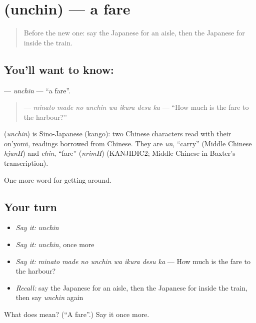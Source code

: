 \section[\texorpdfstring{\ja{うんちん} (unchin)}{うんちん (unchin)}]{ (unchin) — a fare}

\label{lesson:JA-C379-unchin}



\begin{quote}
Before the new one: say the Japanese for an aisle, then the Japanese for inside the train.
\end{quote}

\subsection*{You'll want to know: }
\textbf{} — \emph{unchin} — \textquotedblleft{}a fare\textquotedblright{}.

\begin{quote}
\textbf{  } — \emph{minato made no unchin wa ikura desu ka} — \textquotedblleft{}How much is the fare to the harbour?\textquotedblright{}
\end{quote}

\begin{cousinweb}
\textbf{} (\emph{unchin}) is Sino-Japanese (kango): two Chinese characters read with their on'yomi, readings borrowed from Chinese. They are \emph{un}, \textquotedblleft{}carry\textquotedblright{} (Middle Chinese \emph{hjunH}) and \emph{chin}, \textquotedblleft{}fare\textquotedblright{} (\emph{nrimH}) (KANJIDIC2; Middle Chinese in Baxter's transcription).
\end{cousinweb}

\begin{grammarlens}[title={What you've built}]
One more word for getting around.
\end{grammarlens}

\subsection*{Your turn}
\begin{itemize}
\raggedright
  \item \emph{Say it:} \emph{unchin}
  \item \emph{Say it:} \emph{unchin}, once more
  \item \emph{Say it:} \emph{minato made no unchin wa ikura desu ka} — How much is the fare to the harbour?
  \item \emph{Recall:} say the Japanese for an aisle, then the Japanese for inside the train, then say \emph{unchin} again
\end{itemize}

\begin{tcolorbox}[breakable,colback=teal!4,colframe=teal!35!black,title={Before you move on}]
What does  mean? (\textquotedblleft{}A fare\textquotedblright{}.) Say it once more.
\end{tcolorbox}
